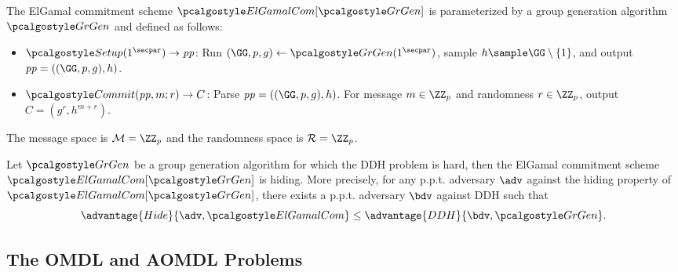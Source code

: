 \begin{definition}
  The ElGamal commitment scheme $\algo{ElGamalCom}[\grgen]$ is parameterized by a group generation algorithm $\grgen$ and defined as follows:
  \begin{itemize}
  \item $\algo{Setup}(1^\secpar) \rightarrow \params$: Run $\gparam \gets \grgen(1^\secpar)$, sample $h \sample \GG \setminus \{1\}$, and output $\params = (\gparam, h)$.
  \item $\algo{Commit}(\params, m; r) \rightarrow C$: Parse $\params = ((\GG, p, g), h)$. For message $m \in \ZZ_p$ and randomness $r \in \ZZ_p$, output $C = (g^r, h^{m+r})$.
  \end{itemize}
  The message space is $\mathcal{M} = \ZZ_p$ and the randomness space is $\mathcal{R} = \ZZ_p$.
\end{definition}

\begin{theorem}
  Let $\grgen$ be a group generation algorithm for which the DDH problem is hard, then the ElGamal commitment scheme $\algo{ElGamalCom}[\grgen]$ is hiding.
  More precisely, for any p.p.t. adversary $\adv$ against the hiding property of $\algo{ElGamalCom}[\grgen]$, there exists a p.p.t. adversary $\bdv$ against DDH such that
  \[
  \advantage{Hide}{\adv, \algo{ElGamalCom}} \leq \advantage{DDH}{\bdv, \grgen}.
  \]
\end{theorem}

\subsection{The OMDL and AOMDL Problems}

